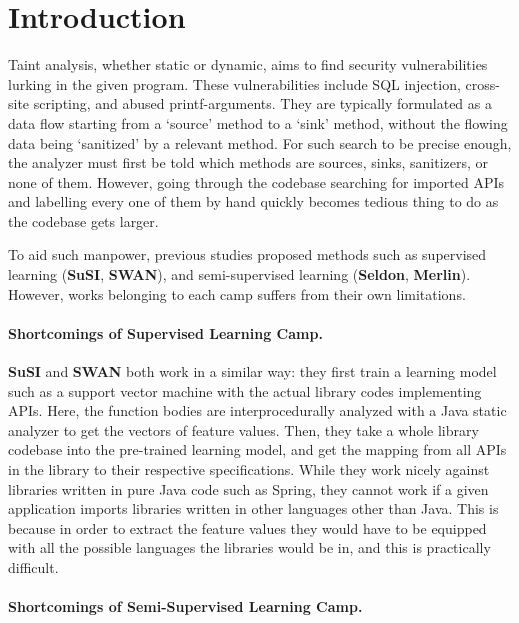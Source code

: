 \documentclass[sigconf,review,anonymous]{acmart}\settopmatter{printfolios=true,printccs=false,printacmref=false}
\begin{document}
\section{Introduction}
Taint analysis, whether static or dynamic, aims to find security vulnerabilities lurking
in the given program. These vulnerabilities include SQL injection, cross-site
scripting, and abused printf-arguments. They are typically formulated as a
data flow starting from a `source' method to a `sink' method, without the
flowing data being `sanitized' by a relevant method. For such search to be
precise enough, the analyzer must first be told which methods are sources,
sinks, sanitizers, or none of them. However, going through the codebase
searching for imported APIs and labelling every one of them by hand quickly becomes tedious
thing to do as the codebase gets larger.

To aid such manpower, previous studies proposed methods such as supervised
learning (\textbf{SuSI}, \textbf{SWAN}), and semi-supervised learning (\textbf{Seldon}, \textbf{Merlin}).
However, works belonging to each camp suffers from their own limitations.

\paragraph{Shortcomings of Supervised Learning Camp.}

\textbf{SuSI} and \textbf{SWAN} both work in a similar way: they first train a learning model
such as a support vector machine with the actual library codes implementing
APIs. Here, the function bodies are interprocedurally analyzed with a Java
static analyzer to get the vectors of feature values. Then, they take a whole
library codebase into the pre-trained learning
model, and get the mapping from all APIs in the library to their respective
specifications. While they work nicely against libraries written in pure Java
code such as Spring, they cannot work if a given application imports libraries
written in other languages other than Java. This is because in order to extract
the feature values they would have to be equipped with all the possible
languages the libraries would be in, and this is practically difficult.


\paragraph{Shortcomings of Semi-Supervised Learning Camp.}
\end{document}
